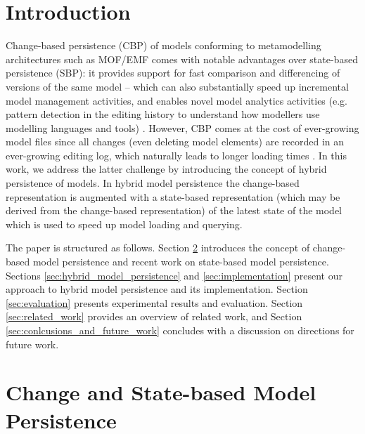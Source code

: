 \documentclass{llncs}
\begin{document}
\vspace{-20pt}
\section{Introduction}
\label{sec:introduction}

\vspace{-10pt}
Change-based persistence (CBP) of models \cite{DBLP:conf/models/YohannisKP17} conforming to metamodelling architectures such as MOF/EMF \cite{omg2018mof,steinberg2008emf} comes with notable advantages over state-based persistence (SBP): it provides support for fast comparison and differencing of versions of the same model \cite{DBLP:conf/sde/LippeO92,DBLP:conf/caise/IgnatN05,DBLP:conf/edoc/KoegelHLHD10,koegel2010emfstore} -- which can also substantially speed up incremental model management activities, and enables novel model analytics activities (e.g. pattern detection in the editing history to understand how modellers use modelling languages and tools) \cite{DBLP:journals/entcs/RobbesL07}. However, CBP comes at the cost of ever-growing model files \cite{DBLP:conf/edoc/KoegelHLHD10,DBLP:journals/entcs/RobbesL07} since all changes (even deleting model elements) are recorded in an ever-growing editing log, which naturally leads to longer loading times \cite{mens2002state}. In this work, we address the latter challenge by introducing the concept of hybrid persistence of models. In hybrid model persistence the change-based representation is augmented with a state-based representation (which may be derived from the change-based representation) of the latest state of the model which is used to speed up model loading and querying.

The paper is structured as follows. Section \ref{sec:change_and_state_based_model_persistence} introduces the concept of change-based model persistence and recent work on state-based model persistence. Sections \ref{sec:hybrid_model_persistence} and \ref{sec:implementation} present our approach to hybrid model persistence and its implementation. Section \ref{sec:evaluation} presents experimental results and evaluation. Section \ref{sec:related_work} provides an overview of related work, and Section \ref{sec:conlcusions_and_future_work} concludes with a discussion on directions for future work.

\vspace{-20pt}
\section{Change and State-based Model Persistence}
\label{sec:change_and_state_based_model_persistence}
\end{document}
